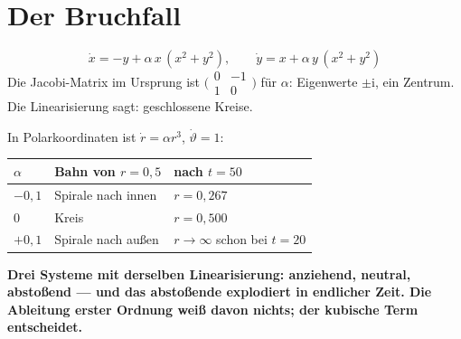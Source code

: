 \section{Der Bruchfall}

\begin{warnung}
\[ \dot x = -y + \alpha\,x\,(x^{2}+y^{2}), \qquad \dot y = x + \alpha\,y\,(x^{2}+y^{2}) \]
Die Jacobi-Matrix im Ursprung ist $\bigl(\begin{smallmatrix}0&-1\\1&0\end{smallmatrix}\bigr)$ für  $\alpha$: Eigenwerte $\pm\mathrm i$, ein Zentrum. Die Linearisierung sagt: geschlossene Kreise.

In Polarkoordinaten ist $\dot r = \alpha r^{3}$, $\dot\vartheta = 1$:
\begin{center}
{\small
\renewcommand{\arraystretch}{1.48}
\begin{tabular}{@{}P{1.6cm}P{3.2cm}P{3.4cm}@{}}
\toprule
$\alpha$ & \textbf{Bahn von $r = 0{,}5$} & \textbf{nach $t = 50$}\\
\midrule
$-0{,}1$ & Spirale nach innen & $r = 0{,}267$\\
$0$ & Kreis & $r = 0{,}500$\\
$+0{,}1$ & Spirale nach außen & $r \to \infty$ schon bei $t = 20$\\
\bottomrule
\end{tabular}}
\end{center}

\begin{center}
\begin{minipage}{0.9\textwidth}
\textbf{Drei Systeme mit derselben Linearisierung: anziehend, neutral, abstoßend --- und das abstoßende explodiert in endlicher Zeit. Die Ableitung erster Ordnung weiß davon nichts; der kubische Term entscheidet.}
\end{minipage}
\end{center}

\begin{center}
\begin{minipage}{0.88\textwidth}
\end{minipage}
\end{center}
\end{warnung}

